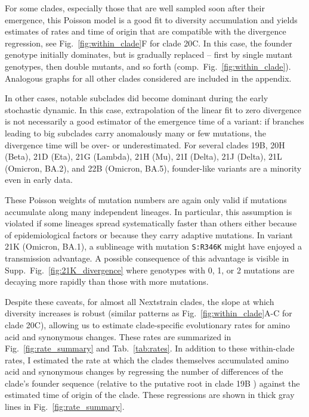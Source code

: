 \documentclass[aps,rmp, twocolumn]{revtex4}
\begin{document}
For some clades, especially those that are well sampled soon after their emergence, this Poisson model is a good fit to diversity accumulation and yields estimates of rates and time of origin that are compatible with the divergence regression, see Fig.~\ref{fig:within_clade}F for clade 20C.
In this case, the founder genotype initially dominates, but is gradually replaced -- first by single mutant genotypes, then double mutants, and so forth (comp.~Fig.~\ref{fig:within_clade}).
Analogous graphs for all other clades considered are included in the appendix.

In other cases, notable subclades did become dominant during the early stochastic dynamic.
In this case, extrapolation of the linear fit to zero divergence is not necessarily a good estimator of the emergence time of a variant: if branches leading to big subclades carry anomalously many or few mutations, the divergence time will be over- or underestimated.
For several clades 19B, 20H (Beta), 21D (Eta), 21G (Lambda), 21H (Mu), 21I (Delta), 21J (Delta), 21L (Omicron, BA.2), and 22B (Omicron, BA.5), founder-like variants are a minority even in early data.

These Poisson weights of mutation numbers are again only valid if mutations accumulate along many independent lineages.
In particular, this assumption is violated if some lineages spread systematically faster than others either because of epidemiological factors or because they carry adaptive mutations.
In variant 21K (Omicron, BA.1), a sublineage with mutation \texttt{S:R346K} might have enjoyed a transmission advantage.
A possible consequence of this advantage is visible in Supp.~Fig.~\ref{fig:21K_divergence} where genotypes with 0, 1, or 2 mutations are decaying more rapidly than those with more mutations.


Despite these caveats, for almost all Nextstrain clades, the slope at which diversity increases is robust (similar patterns as Fig.~\ref{fig:within_clade}A-C for clade 20C), allowing us to estimate clade-specific evolutionary rates for amino acid and synonymous changes.
These rates are summarized in Fig.~\ref{fig:rate_summary} and Tab.~\ref{tab:rates}.
In addition to these within-clade rates, I estimated the rate at which the clades themselves accumulated amino acid and synonymous changes by regressing the number of differences of the clade's founder sequence (relative to the putative root in clade 19B \citep{caraballo-ortiz_tophap_2022}) against the estimated time of origin of the clade.
These regressions are shown in thick gray lines in Fig.~\ref{fig:rate_summary}.
\end{document}
